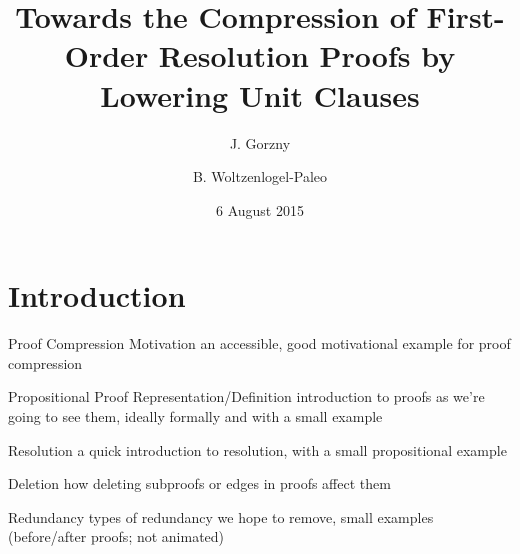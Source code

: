 \documentclass{beamer}
\title[First Order Lower Units] %
{Towards the Compression of First-Order Resolution Proofs by Lowering Unit Clauses}
\author[Gorzny, Woltzenlogel-Paleo] %
{J. Gorzny\inst{1} \and B. Woltzenlogel-Paleo\inst{2}}
\institute[] %
{
  \inst{1}%
  University of Victoria
  \and
  \inst{2}%
  Vienna University of Technology}
\date[CADE15] %
{6 August 2015}
\begin{document}
\begin{frame}
  \titlepage
\end{frame}





\section{Introduction}


\begin{frame}{Proof Compression Motivation}
an accessible, good motivational example for proof compression
\end{frame}

\begin{frame}{Propositional Proof Representation/Definition}
introduction to proofs as we're going to see them, ideally formally and with a small example
\end{frame}

\begin{frame}{Resolution}
a quick introduction to resolution, with a small propositional example
\end{frame}

\begin{frame}{Deletion}
how deleting subproofs or edges in proofs affect them
\end{frame}

\begin{frame}{Redundancy}
types of redundancy we hope to remove, small examples (before/after proofs; not animated)
\end{frame}
\end{document}
